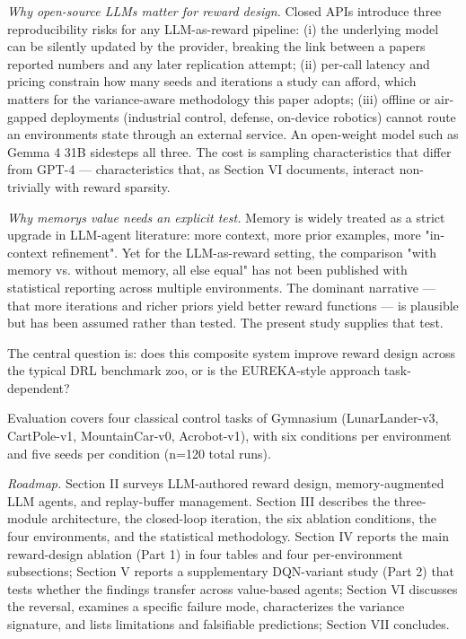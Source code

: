 \emph{Why open-source LLMs matter for reward design.} Closed APIs introduce three reproducibility risks for any LLM-as-reward pipeline: (i) the underlying model can be silently updated by the provider, breaking the link between a paper\textquotesingle s reported numbers and any later replication attempt; (ii) per-call latency and pricing constrain how many seeds and iterations a study can afford, which matters for the variance-aware methodology this paper adopts; (iii) offline or air-gapped deployments (industrial control, defense, on-device robotics) cannot route an environment\textquotesingle s state through an external service. An open-weight model such as Gemma 4 31B sidesteps all three. The cost is sampling characteristics that differ from GPT-4 --- characteristics that, as Section VI documents, interact non-trivially with reward sparsity.

\emph{Why memory\textquotesingle s value needs an explicit test.} Memory is widely treated as a strict upgrade in LLM-agent literature: more context, more prior examples, more "in-context refinement". Yet for the LLM-as-reward setting, the comparison "with memory vs. without memory, all else equal" has not been published with statistical reporting across multiple environments. The dominant narrative --- that more iterations and richer priors yield better reward functions --- is plausible but has been assumed rather than tested. The present study supplies that test.

The central question is: does this composite system improve reward design across the typical DRL benchmark zoo, or is the EUREKA-style approach task-dependent?

Evaluation covers four classical control tasks of Gymnasium (LunarLander-v3, CartPole-v1, MountainCar-v0, Acrobot-v1), with six conditions per environment and five seeds per condition (n=120 total runs).

\emph{Roadmap.} Section II surveys LLM-authored reward design, memory-augmented LLM agents, and replay-buffer management. Section III describes the three-module architecture, the closed-loop iteration, the six ablation conditions, the four environments, and the statistical methodology. Section IV reports the main reward-design ablation (Part 1) in four tables and four per-environment subsections; Section V reports a supplementary DQN-variant study (Part 2) that tests whether the findings transfer across value-based agents; Section VI discusses the reversal, examines a specific failure mode, characterizes the variance signature, and lists limitations and falsifiable predictions; Section VII concludes.

